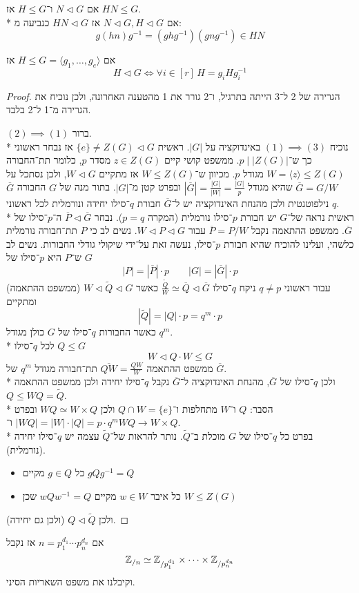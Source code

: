 \begin{remark}
	אם $N \triangleleft G$ ו־$H \le G$ אז $HN \le G$. \\*
	אם $N \triangleleft G, H \triangleleft G$ אז $HN \triangleleft G$ כנביעה מ:
	\[
		g(hn)g^{-1} = (ghg^{-1})(gng^{-1}) \in HN
	\]
\end{remark}
\begin{remark}
	אם $H \le G = \langle g_1, \dots, g_e \rangle$ אז
	\[
		H \triangleleft G \iff \forall i \in [r] \, H = g_i H g_i^{-1}
	\]
\end{remark}
\begin{proof}
	הגרירה של 2 ל־3 הייתה בתרגיל, ו־2 גורר את 1 מהטענה האחרונה, ולכן נוכיח את הגרירה מ־1 ל־2 בלבד.

	$(2) \implies (1)$ ברור.\\*
	נוכיח $(1) \implies (3)$ באינדוקציה על $|G|$.
	ראשית $\{e\} \ne Z(G) \triangleleft G$ אז נבחר ראשוני כך ש־$p \mid |Z(G)|$.
	ממשפט קושי קיים $z \in Z(G)$ מסדר $p$, כלומר תת־החבורה $W = \langle z \rangle \le Z(G)$ מגודל $p$.
	מכיוון ש־$W \le Z(G)$ אז מתקיים $W \triangleleft G$, ולכן נסתכל על $\overline{G} = G / W$ שהיא מגודל $|\overline{G}| = \frac{|G|}{|W|} = \frac{|G|}{p}$ ובפרט קטן מ־$|G|$.
	בתור מנה של $G$ החבורה $\overline{G}$ נילפוטנטית ולכן מהנחת האינדוקציה יש ל־$\overline{G}$ חבורת $q$־סילו יחידה ונורמלית לכל ראשוני $q$. \\*
	ראשית נראה של־$G$ יש חבורת $p$־סילו נורמלית (המקרה $p = q$).
	נבחר $\overline{P} \triangleleft \overline{G}$ ה־$p$־סילו של $\overline{G}$.
	ממשפט ההתאמה נקבל $\overline{P} = P / W$ עבור $W \triangleleft P \triangleleft G$.
	נשים לב כי $P$ תת־חבורה נורמלית כלשהי, ועלינו להוכיח שהיא חבורת $p$־סילו, נעשה זאת על־ידי שיקולי גודלי החבורות.
	נשים לב ש־$P$ היא $p$־סילו של $G$
	\[
		|P| = |\overline{P}| \cdot p
		\qquad
		|G| = |\overline{G}| \cdot p
	\]
	עבור ראשוני $q \ne p$ ניקח $q$־סילו $\frac{\tilde{Q}}{W} \simeq \overline{Q} \triangleleft \overline{G}$ כאשר $W \triangleleft \tilde{Q} \triangleleft G$ (ממשפט ההתאמה) ומתקיים
	\[
		|\tilde{Q}| = |Q| \cdot p = q^m \cdot p
	\]
	כאשר החבורות $q$־סילו של $G$ כולן מגודל $q^m$.\\*
	לכל $q$־סילו $Q \le G$
	\[
		W \triangleleft Q \cdot W \le G
	\]
	ממשפט ההתאמה $\overline{QW} = \frac{QW}{W}$ תת־חבורה מגודל $q^m$ של $\overline{G}$. \\*
	ולכן $q$־סילו של $\overline{G}$, מהנחת האינדוקציה ל־$\overline{G}$ נקבל $q$־סילו יחידה ולכן ממשפט ההתאמה $Q \le WQ = \tilde{Q}$. \\*
	הסבר: $Q$ ו־$W$ מתחלפות ו־$Q \cap W = \{ e \}$ ולכן $WQ \simeq W \times Q$ ובפרט $|WQ| = |W| \cdot |Q| = p \cdot q^m$ ו־$WQ \to W \times Q$. \\*
	בפרט כל $q$־סילו של $G$ מוכלת ב־$\tilde{Q}$.
	נותר להראות של־$\tilde{Q}$ עצמה יש $q$־סילו יחידה (נורמלית).
	\begin{itemize}
		\item כל $g \in Q$ מקיים $g Q g^{-1} = Q$
		\item כל איבר $w \in W$ מקיים $w Q w^{-1} = Q$ שכן $W \le Z(G)$
	\end{itemize}
	ולכן $Q \triangleleft \tilde{Q}$ (ולכן גם יחידה).
\end{proof}
\begin{example}
	אם $n = p_1^{d_1} \cdots p_n^{d_n}$ אז נקבל
	\[
		\mathbb{Z}_{/n} \simeq \mathbb{Z}_{/p_1^{d_1}} \times \cdots \times \mathbb{Z}_{/p_n^{d_n}} 
	\]
	וקיבלנו את משפט השאריות הסיני.
\end{example}


